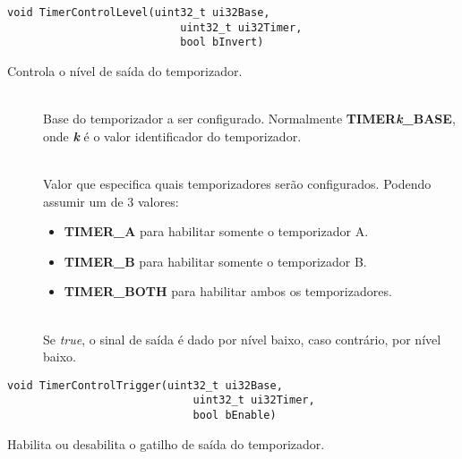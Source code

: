 \begin{lstlisting}[style=funcao]
	void TimerControlLevel(uint32_t ui32Base,
						   uint32_t ui32Timer,
						   bool bInvert)
\end{lstlisting}

Controla o nível de saída do temporizador.

\begin{description}
	\item []\hfill \\
	Base do temporizador a ser configurado. Normalmente \textbf{TIMER\emph{k}\_BASE}, onde \textbf{\emph{k}} é o valor identificador do temporizador.
	
	\item []\hfill \\
	Valor que especifica quais temporizadores serão configurados. Podendo assumir um de 3 valores:
	\begin{itemize}
		\item \textbf{TIMER\_A} para habilitar somente o temporizador A.
		\item \textbf{TIMER\_B} para habilitar somente o temporizador B.
		\item \textbf{TIMER\_BOTH} para habilitar ambos os temporizadores.
	\end{itemize}
	
	\item []\hfill \\
	Se \emph{true}, o sinal de saída é dado por nível baixo, caso contrário, por nível baixo.
\end{description}

\begin{lstlisting}[style=funcao]
	void TimerControlTrigger(uint32_t ui32Base,
							 uint32_t ui32Timer,
							 bool bEnable)
\end{lstlisting}

Habilita ou desabilita o gatilho de saída do temporizador.

